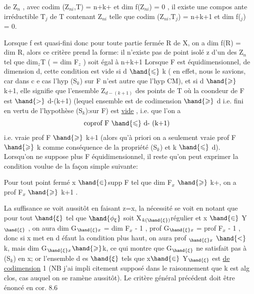 
de Z$_n$ , avec codim (Z$_{ni}$,T) = n+k+ et dim f(Z$_{ni}$) = 0 , il existe
une compos ante irréductible T$_j$ de T contenant Z$_{ni}$ telle que
codim (Z$_{ni}$,T$_j$) = n+k+1 et dim f($_j$) = 0.

Lorsque f est quasi-fini donc pour toute partie fermée R de X,
on a dim f(R) = dim R, alors ce critère prend la forme: il n'existe 
pas de point isolé  z d'un des Z$_n$
  tel que dim$_z$T ( = dim F$_z$ ) soit égal à
n+k+1  Lorsque F est équidimensionnel, 
de dimension d,  cette condition
est vide si d $\hand{\leqslant}$ k ( en effet, nous le savions, car dans c e cas l'hyp
(S$_k$) sur F n'est autre que l'hyp CM), et si d $\hand{\geqslant}$ k+1, elle signifie
que l'ensemble Z$_{d - (k+1)}$ des points de T où la coondeur de F est
$\hand{>}$ d-(k+1) (lequel ensemble est de codimension $\hand{\geqslant}$ d i.e. fini en vertu de
l'hypothèse (S$_k$):sur F) est \uline{vide} , i.e. que 
l'on a 
\[ \text{coprof F } \hand{\leqslant} \text{ d- (k+1)} \]
i.e. vraie prof F $\hand{\geqslant}$ k+1
(alors qu'à priori on a seulement vraie prof F $\hand{\geqslant}$ k comme conséquence
de la propriété (S$_k$) et k $\hand{\leqslant}$ d). Lorsqu'on ne suppose plus F 
 équidimensionnel, il reste qu'on
peut exprimer la condition voulue de la façon simple suivante:

 Pour tout point fermé x $\hand{\in}$supp F tel que dim F$_x$ $\hand{\geqslant}$ k+, on a prof F$_x$ $\hand{\geqslant}$ k+1 .

La suffisance se voit aussitôt en faisant z=x, la nécessité se voit  en
notant que pour tout $\hand{\xi}$ tel que $\hand{\phi_\xi}$ soit X$_{k(\hand{\xi})}$\hand{\unsure{$-$|$+$}}régulier et x $\hand{\in}$ Y$_{\hand{\xi}}$ ,
on aura dim G$_{\hand{\xi} x}$ = dim F$_x$ - 1 , prof G$_{\hand{\xi} x}$ = prof F$_x$ - 1 , donc si
x met en d éfaut la condition plus haut, on aura prof $_{\hand{\xi} x}$ $\hand{<}$k, mais
dim G$_{\hand{\xi} x}$$\hand{\geqslant}$k, ce qui montre que G$_{\hand{\xi}}$ ne satisfait pas à (S$_k$) en x; or
l'ensemble d es $\hand{\xi}$ tels que x$\hand{\in}$ Y$_{\hand{\xi}}$ est \uline{de codimension} 1 (NB j'ai impli
\placedmargin{|} citement supposé dans le raisonnement que k est alg clos, cas auquel on
se ramène aussitôt). Le critère général précédent doit être énoncé en cor.  8.6
